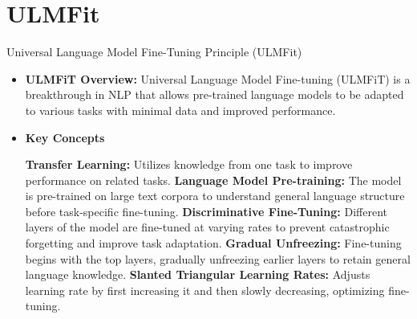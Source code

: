 \documentclass[serif, aspectratio=169]{beamer}
\begin{document}
\section{ULMFit}
\begin{frame}{Universal Language Model Fine-Tuning Principle (ULMFit)}
    \begin{itemize}
        \item \textbf{ULMFiT Overview:} Universal Language Model Fine-tuning (ULMFiT) is a breakthrough in NLP that allows pre-trained language models to be adapted to various tasks with minimal data and improved performance.
        \vspace{0.2cm}
        \item \textbf{Key Concepts}
        \begin{outline}
            \1 \textbf{Transfer Learning:} Utilizes knowledge from one task to improve performance on related tasks.
            \vspace{0.1cm}
            \1 \textbf{Language Model Pre-training:} The model is pre-trained on large text corpora to understand general language structure before task-specific fine-tuning.
            \vspace{0.1cm}
            \1 \textbf{Discriminative Fine-Tuning:} Different layers of the model are fine-tuned at varying rates to prevent catastrophic forgetting and improve task adaptation.
            \vspace{0.1cm}
            \1 \textbf{Gradual Unfreezing:} Fine-tuning begins with the top layers, gradually unfreezing earlier layers to retain general language knowledge.
            \vspace{0.1cm}
            \1 \textbf{Slanted Triangular Learning Rates:} Adjusts learning rate by first increasing it and then slowly decreasing, optimizing fine-tuning.
            \vspace{0.1cm}
        \end{outline}
    \end{itemize}
\end{frame}
\end{document}
